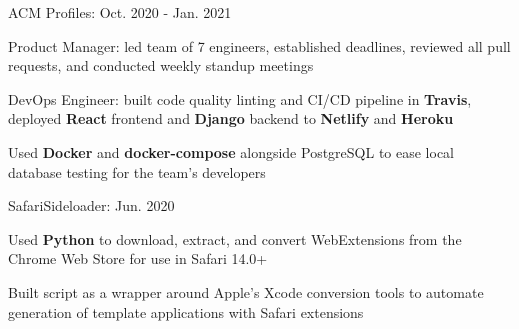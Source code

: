 
\begin{cventries}

  \cvproject
  {ACM Profiles: } %
  {Oct. 2020 - Jan. 2021} %
  {
    \begin{cvitems} %
      \item {Product Manager: led team of 7 engineers, established deadlines, reviewed all pull requests, and conducted weekly standup meetings}
      \item {DevOps Engineer: built code quality linting and CI/CD pipeline in \textbf{Travis}, deployed \textbf{React} frontend and \textbf{Django} backend to \textbf{Netlify} and \textbf{Heroku}}
      \item {Used \textbf{Docker} and \textbf{docker-compose} alongside PostgreSQL to ease local database testing for the team's developers}
    \end{cvitems}
  }

  \cvproject
    {SafariSideloader: } %
    {Jun. 2020} %
    {
      \begin{cvitems} %
        \item {Used \textbf{Python} to download, extract, and convert WebExtensions from the Chrome Web Store for use in Safari 14.0+}
        \item {Built script as a wrapper around Apple's Xcode conversion tools to automate generation of template applications with Safari extensions}
      \end{cvitems}
    }


\end{cventries}
